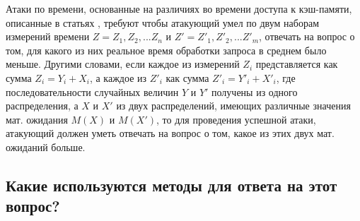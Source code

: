 Атаки по времени, основанные на различиях во времени доступа к кэш-памяти,
описанные в статьях \cite{bernstein} \cite{anmodel} \cite{remote-aes},
требуют чтобы атакующий умел по двум наборам измерений времени
$Z = {Z_1, Z_2, ... Z_n}$ и $Z' = {Z'_1, Z'_2, ... Z'_m}$, отвечать
на вопрос о том, для какого из них реальное время обработки запроса в среднем
было меньше. Другими словами, если каждое из измерений $Z_i$ представляется как сумма
$Z_i = Y_i + X_i$, а каждое из $Z'_i$ как сумма $Z'_i = Y'_i + X'_i$, где
последовательности случайных величин $Y$ и $Y'$ получены из одного распределения,
а $X$ и $X'$ из двух распределений, имеющих различные значения мат. ожидания
$M(X)$ и $M(X')$, то для проведения успешной атаки, атакующий должен уметь отвечать
на вопрос о том, какое из этих двух мат. ожиданий больше.


\subsection{Какие используются методы для ответа на этот вопрос?}

\clearpage
